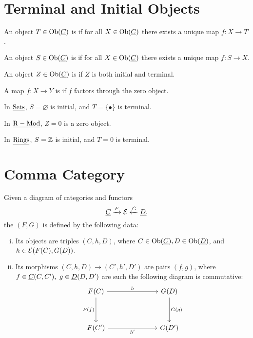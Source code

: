 \section{Terminal and Initial Objects}

\begin{definitions*}
	\item An object \( T \in \operatorname{Ob}(\underline{C}) \) is  if for all \( X \in \operatorname{Ob}(\underline{C}) \) there exists a unique map \( f: X \to T \).

	\item An object \( S \in \operatorname{Ob}(\underline{C}) \) is  if for all \( X \in \operatorname{Ob}(\underline{C}) \) there exists a unique map \( f: S \to X \).

	\item An object \( Z \in \operatorname{Ob}(\underline{C}) \) is  if \( Z \) is both initial and terminal.
	\item A map \( f: X \to Y \) is  if \( f \) factors through the zero object.
\end{definitions*}

\begin{examples*}
	\item In \( \underline{\mathrm{Sets}} \), \( S = \varnothing \) is initial, and \( T = \{\bullet\} \) is terminal.
	\item In \( \underline{\mathrm{R-Mod}} \), \( Z = 0 \) is a zero object.
	\item In \( \underline{\mathrm{Rings}} \), \( S = \mathbb{Z} \) is initial, and \( T = 0 \) is terminal.
\end{examples*}

\section{Comma Category}

\begin{definition*}
	Given a diagram of categories and functors
	\[
		\underline{C} \xrightarrow{F} \mathcal{E} \xleftarrow{G} \underline{D},
	\]
	the  \( (F \comma G) \) is defined by the following data:
	\begin{enumerate}[i)]
		\item Its objects are triples \( (C, h, D) \), where \( C \in \operatorname{Ob}(\underline{C}), D \in \operatorname{Ob}(\underline{D}) \), and \( h \in \mathcal{E}(F(C), G(D)) \).
		\item Its morphisms \( (C, h, D) \to (C', h', D') \) are pairs \( (f, g) \), where \( f \in \underline{C}(C, C'),~ g \in \underline{D}(D, D') \)
			are such the following diagram is commutative:
			\[
				\begin{tikzcd}{F(C)} &&& {G(D)} \\
					\\
					{F(C')} &&& {G(D')}
					\arrow["h", from=1-1, to=1-4]
					\arrow["{F(f)}"', from=1-1, to=3-1]
					\arrow["{G(g)}", from=1-4, to=3-4]
					\arrow["{h'}"', from=3-1, to=3-4]
				\end{tikzcd}
			\]
	\end{enumerate}
\end{definition*}

